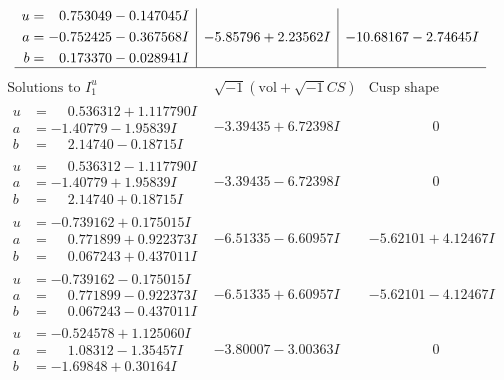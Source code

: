 \documentclass[1p]{elsarticle_modified}
\theoremstyle{definition}
\newcommand{\I}{\sqrt{-1}}
\begin{document}
$$\begin{array}{c|c|c}
\begin{aligned}
u &= \phantom{-}0.753049 - 0.147045 I \\
a &= -0.752425 - 0.367568 I \\
b &= \phantom{-}0.173370 - 0.028941 I\end{aligned}
 & -5.85796 + 2.23562 I & -10.68167 - 2.74645 I\\
 \hline 
 \end{array}$$\newpage$$\begin{array}{c|c|c}  
\text{Solutions to }I^u_{1}& \I (\text{vol} + \sqrt{-1}CS) & \text{Cusp shape}\\
 \hline 
\begin{aligned}
u &= \phantom{-}0.536312 + 1.117790 I \\
a &= -1.40779 - 1.95839 I \\
b &= \phantom{-}2.14740 - 0.18715 I\end{aligned}
 & -3.39435 + 6.72398 I & \phantom{-0.000000 } 0 \\ \hline\begin{aligned}
u &= \phantom{-}0.536312 - 1.117790 I \\
a &= -1.40779 + 1.95839 I \\
b &= \phantom{-}2.14740 + 0.18715 I\end{aligned}
 & -3.39435 - 6.72398 I & \phantom{-0.000000 } 0 \\ \hline\begin{aligned}
u &= -0.739162 + 0.175015 I \\
a &= \phantom{-}0.771899 + 0.922373 I \\
b &= \phantom{-}0.067243 + 0.437011 I\end{aligned}
 & -6.51335 - 6.60957 I & -5.62101 + 4.12467 I \\ \hline\begin{aligned}
u &= -0.739162 - 0.175015 I \\
a &= \phantom{-}0.771899 - 0.922373 I \\
b &= \phantom{-}0.067243 - 0.437011 I\end{aligned}
 & -6.51335 + 6.60957 I & -5.62101 - 4.12467 I \\ \hline\begin{aligned}
u &= -0.524578 + 1.125060 I \\
a &= \phantom{-}1.08312 - 1.35457 I \\
b &= -1.69848 + 0.30164 I\end{aligned}
 & -3.80007 - 3.00363 I & \phantom{-0.000000 } 0 \\ \hline\begin{aligned}

\end{aligned}
\end{array}$$
\end{document}

